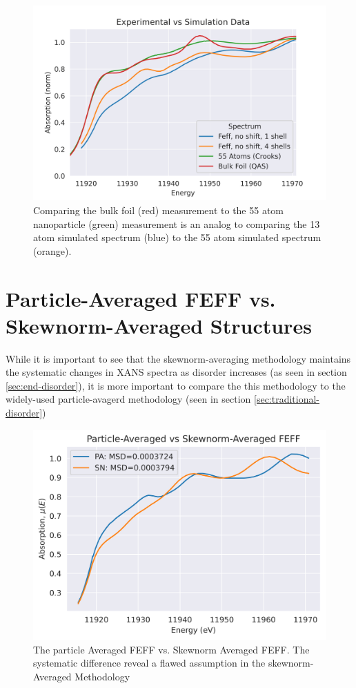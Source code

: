 \begin{figure}[h]
	\centering
	\includegraphics[width=.7\linewidth]{Chapters/Figures/Bulk_55atom_experimental_theory_comparison.png}
	\caption[Simulation vs. Experimental 2]{Comparing the bulk foil (red) measurement to the 55 atom nanoparticle (green) measurement is an analog to comparing the 13 atom simulated spectrum (blue) to the 55 atom simulated spectrum (orange).}
	\label{fig:avg-experimental-vs-simulation2}
\end{figure}

\section{Particle-Averaged FEFF vs. Skewnorm-Averaged Structures} \label{sec:pa-feff-vs-gaussian-feff}
While it is important to see that the skewnorm-averaging methodology maintains the systematic changes in XANS spectra as disorder increases (as seen in section \ref{sec:end-disorder}), it is more important to compare the this methodology to the widely-used particle-avagerd methodology (seen in section \ref{sec:traditional-disorder})





\begin{figure}[!h]
	\centering
	\label{fig:pa-vs-sknm-feff}
	\includegraphics[width=.75\linewidth]{Chapters/Figures/PA-vs-skewnorm-newvals.png}
	\caption[Particle-Averaged vs. Skewnorm-Averaged FEFF Low-Disorder]{The particle Averaged FEFF vs. Skewnorm Averaged FEFF. The systematic difference reveal a flawed assumption in the skewnorm-Averaged Methodology}
\end{figure}


